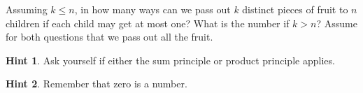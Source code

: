 \documentclass{book}
\begin{document}
\setcounter{cpjt}{90}
\addtocounter{cpjt}{-1}
\begin{activity}\label{activity-83}
\hypertarget{p-647}{}%
Assuming \(k\le n\), in how many ways can we pass out \(k\) distinct pieces of fruit to \(n\) children if each child may get at most one? What is the number if \(k>n\)? Assume for both questions that we pass out all the fruit.%
\par\smallskip%
\noindent\textbf{Hint 1}.\hypertarget{hint-43}{}\quad%
\hypertarget{p-648}{}%
Ask yourself if either the sum principle or product principle applies.%
\par\smallskip%
\noindent\textbf{Hint 2}.\hypertarget{hint-44}{}\quad%
\hypertarget{p-649}{}%
Remember that zero is a number.%
\par\smallskip%
\noindent\end{activity}

\clearpage
\end{document}
